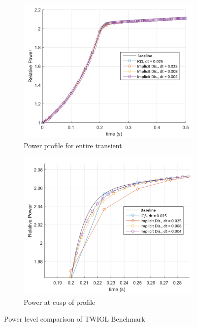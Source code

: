 \documentclass{elsarticle}
\begin{document}
\begin{figure}[!htbp]
\centering
\begin{subfigure}[!htbp]{0.49\textwidth}
\includegraphics[width=\textwidth]{figures/TWIGL_power_plot.png}
\caption{Power profile for entire transient}
\end{subfigure}
\begin{subfigure}[!htbp]{0.49\textwidth}
\includegraphics[width=\textwidth]{figures/TWIGL_power_plot2.png}
\caption{Power at cusp of profile}
\end{subfigure}
\caption{Power level comparison of TWIGL Benchmark}
\label{fig:TWIGL_power}
\end{figure}
\end{document}
